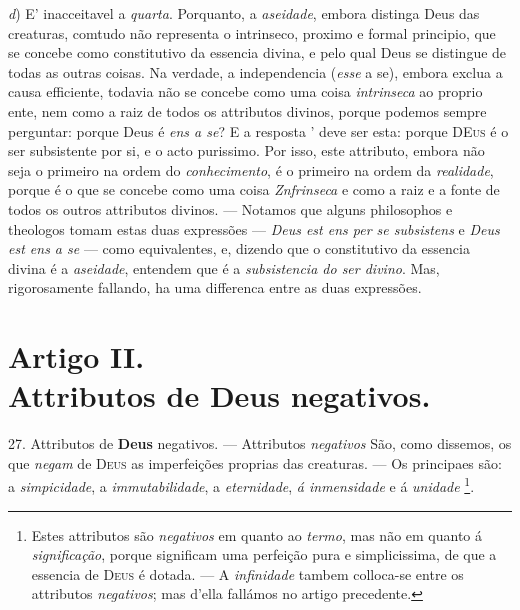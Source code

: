 \emph{d}) E' inacceitavel a \emph{quarta}. Porquanto, a \emph{aseidade}, embora distinga Deus das creaturas, comtudo não representa o intrinseco, proximo e formal principio, que se concebe como constitutivo da essencia divina, e pelo qual Deus se distingue de todas as outras coisas. Na verdade, a independencia (\emph{esse} a se), embora exclua a causa efficiente, todavia não se concebe como uma coisa \emph{intrinseca} ao proprio ente, nem como a raiz de todos os attributos divinos, porque podemos sempre perguntar: porque Deus é \emph{ens a se}? E a resposta ' deve ser esta: porque \textsc{DEus} é o ser subsistente por si, e o acto purissimo. Por isso, este attributo, embora não seja o primeiro na ordem do \emph{conhecimento}, é o primeiro na ordem da \emph{realidade}, porque é o que se concebe como uma coisa \emph{Znfrinseca} e como a raiz e a fonte de todos os outros attributos divinos. --- Notamos que alguns philosophos e theologos tomam estas duas expressões --- \emph{Deus est ens per se subsistens} e \emph{Deus est ens a se} --- como equivalentes, e, dizendo que o constitutivo da essencia divina é a \emph{aseidade}, entendem que é a \emph{subsistencia do ser divino}. Mas, rigorosamente fallando, ha uma differenca entre as duas expressões.


\section*{Artigo II.\\ Attributos de Deus negativos.}

 27. Attributos de \textbf{Deus} negativos. --- Attributos \emph{negativos} São, como dissemos, os que \emph{negam} de \textsc{Deus} as imperfeições proprias das creaturas. --- Os principaes são: a \emph{simpicidade}, a \emph{immutabilidade}, a \emph{eternidade}, \emph{á inmensidade} e á \emph{unidade} \footnote{Estes attributos são \emph{negativos} em quanto ao \emph{termo}, mas não em quanto á \emph{significação}, porque significam uma perfeição pura e simplicissima, de que a essencia de \textsc{Deus} é dotada. --- A \emph{infinidade} tambem colloca-se entre os attributos \emph{negativos}; mas d'ella fallámos no artigo precedente.}.

